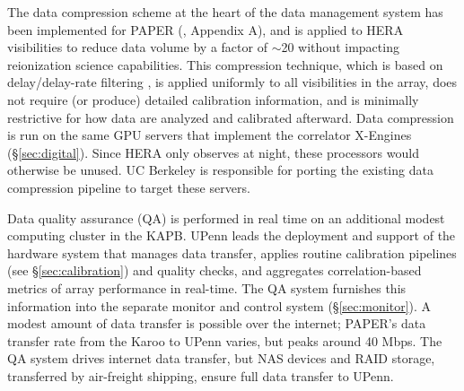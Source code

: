 \documentclass[preprint]{aastex}
\begin{document}
The data compression scheme at the heart of the data management system
has been implemented for PAPER (\citealt{parsons_et_al2013},
Appendix A), and is applied to HERA visibilities to reduce data volume by
a factor of $\sim$20 without impacting reionization science
capabilities.  This compression technique, which is based on delay/delay-rate
filtering \citep{parsons_backer2009}, is applied uniformly to all visibilities
in the array, does not require (or produce) detailed calibration
information, and is minimally restrictive for how data are analyzed and calibrated afterward.
Data compression is run on the same GPU servers
that implement the correlator X-Engines (\S\ref{sec:digital}).  Since HERA only observes at night,
these processors would otherwise be unused.  UC Berkeley is responsible for porting
the existing data compression pipeline to target these servers.

Data quality assurance (QA) is performed in real time on an additional modest 
computing cluster in the
KAPB.  UPenn leads the deployment and support of the hardware system that
manages data transfer, applies routine calibration pipelines (see \S\ref{sec:calibration}) and quality
checks, and aggregates correlation-based metrics of array performance in real-time.  The QA system
furnishes this information into the separate monitor and control system (\S\ref{sec:monitor}).
A modest amount of data transfer is possible over the internet; PAPER's data transfer rate from the Karoo
to UPenn varies, but peaks around 40 Mbps.  The QA system drives internet data transfer, but
NAS devices and RAID storage, transferred by air-freight shipping, ensure full data transfer to UPenn.



\end{document}
